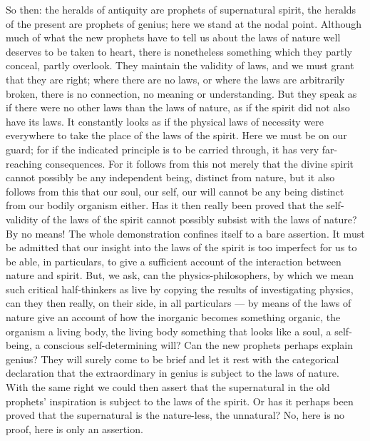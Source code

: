 \documentclass[12pt,a4paper,openany]{book}
\newcommand{\opage}[1]{\marginnote{\footnotesize\textit{[#1]}}}
\begin{document}
So then: the heralds of antiquity are prophets of supernatural
spirit, the heralds of the present are prophets of genius;
here we stand at the nodal point. Although much of what
the new prophets have to tell us about the laws of nature well
deserves to be taken to heart, there is nonetheless something
which they partly conceal, partly overlook. They maintain the
validity of laws, and we must grant that they are right; where there are no
laws, or where the laws are arbitrarily broken, there is
no connection, no meaning or understanding.
But they speak as if there were no other laws than
the laws of nature, as if the spirit did not also have its
laws. It constantly looks as if the physical
laws of necessity were everywhere to take the place of the laws of the spirit.
Here we must be on our guard; for if the indicated
principle is to be carried through, it has
very far-reaching consequences. For it follows from this not
merely that the divine spirit cannot possibly be
any independent being, distinct from nature, but
it also follows from this that our soul, our self, our will
cannot be any being distinct from our bodily organism
either. Has it then really been proved
that the self-validity of the laws of the spirit cannot possibly subsist with
the laws of nature? By no means! The whole demonstration
\setcounter{footnote}{0}%
\opage{15}confines itself to a bare assertion. It must be
admitted that our insight into the laws of the spirit is too imperfect
for us to be able, in particulars, to give a sufficient
account of the interaction between nature
and spirit. But, we ask, can the physics-philosophers,
by which we mean such critical half-thinkers as
live by copying the results of investigating physics,
can they then really, on their side, in all particulars --- by
means of the laws of nature give an account of how the
inorganic becomes something organic, the organism a
living body, the living body something that
looks like a soul, a self-being, a conscious
self-determining will? Can the new prophets perhaps
explain genius? They will surely come to
be brief and let it rest with the categorical
declaration that the extraordinary in genius is subject to the laws
of nature. With the same right we could then assert
that the supernatural in the old prophets'
inspiration is subject to the laws of the spirit. Or has it
perhaps been proved that the supernatural is the
nature-less, the unnatural? No, here is no proof,
here is only an assertion.
\end{document}
